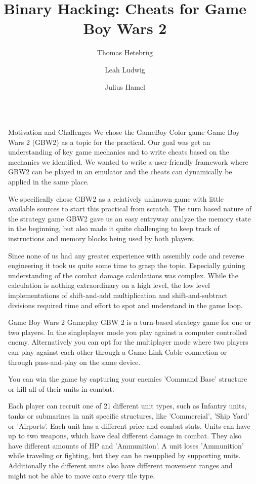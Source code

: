 \documentclass[final,dvipsnames]{beamer}
\title{Binary Hacking: Cheats for Game Boy Wars 2}
\author{Thomas Hetebrüg \inst{1} \and Leah Ludwig \inst{1} \and Julius Hamel \inst{1}}
\institute[shortinst]{\inst{1} Heidelberg University}
\newlength{\sepwidth}
\newlength{\colwidth}
\newcommand{\separatorcolumn}{\begin{column}{\sepwidth}\end{column}}
\begin{document}
\begin{frame}[t, fragile]
\begin{columns}[t]
\separatorcolumn

\begin{column}{\colwidth}

	\begin{block}{Motivation and Challenges}
	We chose the GameBoy Color game Game Boy Wars 2 (GBW2) as a topic for the practical. Our goal was get an understanding of key game mechanics and to write cheats based on the mechanics we identified. We wanted to write a user-friendly framework where GBW2 can be played in an emulator and the cheats can dynamically be applied in the same place.
	
	We specifically chose GBW2 as a relatively unknown game with little available sources to start this practical from scratch. The turn based nature of the strategy game GBW2 gave us an easy entryway analyze the memory state in the beginning, but also made it quite challenging to keep track of instructions and memory blocks being used by both players.
	
	Since none of us had any greater experience with assembly code and reverse engineering it took us quite some time to grasp the topic. Especially gaining understanding of the combat damage calculations was complex. While the calculation is nothing extraordinary on a high level, the low level implementations of shift-and-add multiplication and shift-and-subtract divisions required time and effort to spot and understand in the game loop.
	
	\end{block}

	\begin{block}{Game Boy Wars 2 Gameplay}
	GBW 2 is a turn-based strategy game for one or two players. In the singleplayer mode you play against a computer controlled enemy. Alternatively you can opt for the multiplayer mode where two players can play against each other through a Game Link Cable connection or through pass-and-play on the same device.
	
	You can win the game by capturing your enemies 'Command Base' structure or kill all of their units in combat.
	
	Each player can recruit one of 21 different unit types, such as Infantry units, tanks or submarines in unit specific structures, like 'Commercial', 'Ship Yard' or 'Airports'. Each unit has a different price and combat stats. Units can have up to two weapons, which have deal different damage in combat.
	They also have different amounts of HP and 'Ammunition'. A unit loses 'Ammunition' while traveling or fighting, but they can be resupplied by supporting units. Additionally the different units also have different movement ranges and might not be able to move onto every tile type.
	

\end{block}
\end{column}
\end{columns}
\end{frame}
\end{document}
